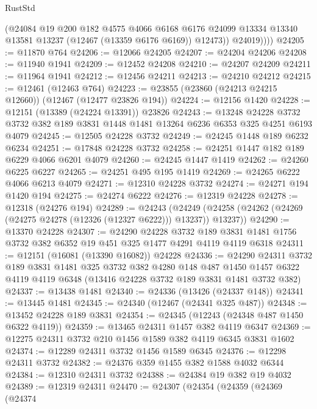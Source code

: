 \begin{lexlean}{RustStd}
\begin{coremodule}
              (@24084
                @19
                @200
                @182
                @4575
                @4066
                @6168
                @6176
                @24099
                @13334
                @13340
                @13581
                @13237
                (@12467 (@13359 @6176 @6169))
                @12473))
            @24019))))
@24205 := @11870 @764
@24206 := @12066 @24205
@24207 := @24204 @24206
@24208 := @11940 @1941
@24209 := @12452 @24208
@24210 := @24207 @24209
@24211 := @11964 @1941
@24212 := @12456 @24211
@24213 := @24210 @24212
@24215 := @12461 (@12463 @764)
@24223 := @23855 (@23860 (@24213 @24215 @12660)) (@12467 (@12477 @23826 @194))
@24224 := @12156 @1420
@24228 := @12151 (@13389 (@24224 @13391)) @23826
@24243 := @13248
    @24228
    @3732
    @3732
    @382
    @189
    @3831
    @1448
    @1481
    @13264
    @6236
    @6353
    @325
    @4251
    @6193
    @4079
@24245 := @12505 @24228 @3732
@24249 := @24245 @1448 @189 @6232 @6234
@24251 := @17848 @24228 @3732
@24258 := @24251 @1447 @182 @189 @6229 @4066 @6201 @4079
@24260 := @24245 @1447 @1419
@24262 := @24260 @6225 @6227
@24265 := @24251 @495 @195 @1419
@24269 := @24265 @6222 @4066 @6213 @4079
@24271 := @12310 @24228 @3732
@24274 := @24271 @194 @1420 @194
@24275 := @24274 @6222
@24276 := @12319 @24228
@24278 := @12318 (@24276 @194)
@24289 := @24243
    (@24249 (@24258 (@24262 (@24269 (@24275 @24278 (@12326 (@12327 @6222))) @13237)) @13237))
@24290 := @13370 @24228
@24307 := @24290
    @24228
    @3732
    @189
    @3831
    @1481
    @1756
    @3732
    @382
    @6352
    @19
    @451
    @325
    @1477
    @4291
    @4119
    @4119
    @6318
@24311 := @12151 (@16081 (@13390 @16082)) @24228
@24336 := @24290
    @24311
    @3732
    @189
    @3831
    @1481
    @325
    @3732
    @382
    @4280
    @148
    @487
    @1450
    @1457
    @6322
    @4119
    @4119
    @6348
    (@13416 @24228 @3732 @189 @3831 @1481 @3732 @382)
@24337 := @13438 @1481
@24340 := @24336 (@13426 (@24337 @148))
@24341 := @13445 @1481
@24345 := @24340 (@12467 (@24341 @325 @487))
@24348 := @13452 @24228 @189 @3831
@24354 := @24345 (@12243 (@24348 @487 @1450 @6322 @4119))
@24359 := @13465 @24311 @1457 @382 @4119 @6347
@24369 := @12275 @24311 @3732 @210 @1456 @1589 @382 @4119 @6345 @3831 @1602
@24374 := @12289 @24311 @3732 @1456 @1589 @6345
@24376 := @12298 @24311 @3732
@24382 := @24376 @359 @1455 @382 @1588 @4032 @6344
@24384 := @12310 @24311 @3732
@24388 := @24384 @19 @382 @19 @4032
@24389 := @12319 @24311
@24470 := @24307
    (@24354
      (@24359
        (@24369
          (@24374

\end{coremodule}
\end{lexlean}
